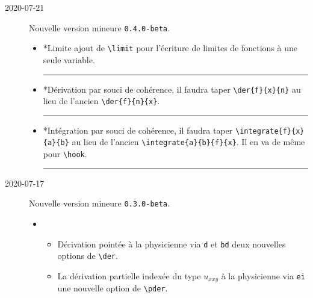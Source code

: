 \documentclass[12pt,a4paper]{article}
\makeatletter
\newcommand\env[1]{\texttt{#1}}
\newcommand\macro[1]{\env{\textbackslash{}#1}}
\theoremstyle{definition}
\newcommand\separation{
	\medskip
	\hfill\rule{0.5\textwidth}{0.75pt}\hfill
	\medskip
}
\newcommand\topic{\@ifstar{\@topic@star}{\@topic@no@star}}
\newcommand\@topic@no@star[1]{%
	\textbf{\textsc{#1}.}%
}
\newcommand\@topic@star[1]{%
	\textbf{\textsc{#1} :}%
}
\makeatother
\begin{document}
\begin{description}

    \medskip
    \item[2020-07-21] Nouvelle version mineure \verb+0.4.0-beta+.
    
    \begin{itemize}[itemsep=.5em]
        \item \topic*{Limite}
              ajout de \macro{limit} pour l'écriture de limites de fonctions à une seule variable.
    
    
        \separation
    
        \item \topic*{Dérivation}
              par souci de cohérence, il faudra taper \verb#\der{f}{x}{n}# au lieu de l'ancien \verb#\der{f}{n}{x}#.
    
    
        \separation
    
        \item \topic*{Intégration}
              par souci de cohérence, il faudra taper \verb#\integrate{f}{x}{a}{b}# au lieu de l'ancien \verb#\integrate{a}{b}{f}{x}#.
              Il en va de même pour \macro{hook}.
    
    
        \separation
    \end{itemize}


    \medskip
    \item[2020-07-17] Nouvelle version mineure \verb+0.3.0-beta+.
    
    \begin{itemize}[itemsep=.5em]
        \item \topic{Dérivation}
        \begin{itemize}[itemsep=.5em]
            \item Dérivation pointée à la physicienne via \verb+d+ et \verb+bd+ deux nouvelles options de \macro{der}.
    
            \item La dérivation partielle indexée du type $u_{xxy}$ à la physicienne via \verb+ei+ une nouvelle option de \macro{pder}.
        \end{itemize}
    
    

\end{itemize}
\end{description}
\end{document}
